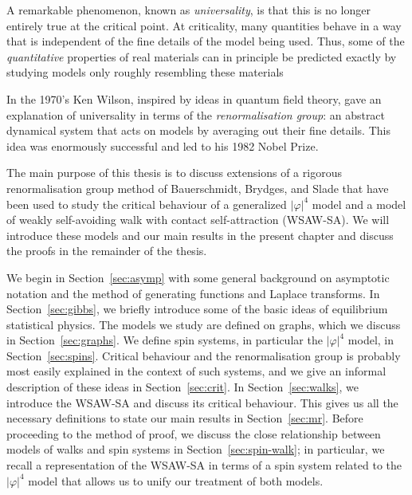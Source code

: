 A remarkable phenomenon, known as \emph{universality}, is that this is no longer
entirely true at the critical point. At criticality, many quantities behave in a
way that is independent of the fine details of the model being used. Thus,
some of the \emph{quantitative} properties of real materials can in principle be
predicted exactly by studying models only roughly resembling these materials

In the 1970's Ken Wilson, inspired by ideas in quantum field theory, gave an
explanation of universality in terms of the \emph{renormalisation group}:
an abstract dynamical system that acts on models by averaging out their fine details.
This idea was enormously successful and led to his 1982 Nobel Prize.

The main purpose of this thesis is to discuss extensions of a
rigorous renormalisation group method of Bauerschmidt, Brydges, and Slade that have
been used to study the
critical behaviour of a generalized $|\varphi|^4$ model and a model of weakly
self-avoiding walk with contact self-attraction (WSAW-SA). We will introduce these
models and our main results in the present chapter and discuss the proofs in the
remainder of the thesis.

We begin in Section~\ref{sec:asymp} with some general background on asymptotic
notation and the method of generating functions and Laplace transforms. In
Section~\ref{sec:gibbs}, we briefly introduce some of the basic ideas of equilibrium
statistical physics. The models we study are defined on graphs, which we
discuss in Section~\ref{sec:graphs}. We define spin systems, in particular
the $|\varphi|^4$ model, in Section~\ref{sec:spins}. Critical behaviour and
the renormalisation group is probably most easily explained in the context of such
systems, and we give an informal description of these ideas in Section~\ref{sec:crit}.
In Section~\ref{sec:walks},
we introduce the WSAW-SA and discuss its critical behaviour. This gives us all
the necessary definitions to state our main results in Section~\ref{sec:mr}.
Before proceeding to the method of proof,
we discuss the close relationship between models of walks and spin systems in
Section~\ref{sec:spin-walk}; in particular, we recall a representation
of the WSAW-SA in terms of a spin system related to the $|\varphi|^4$ model
that allows us to unify our treatment of both models. 

